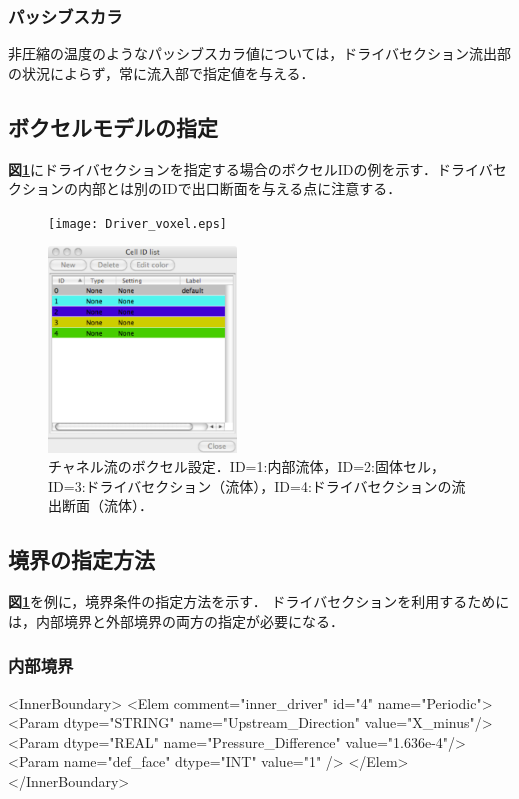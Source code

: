 \subsubsection{パッシブスカラ}
非圧縮の温度のようなパッシブスカラ値については，ドライバセクション流出部の状況によらず，常に流入部で指定値を与える．


%
\subsection{ボクセルモデルの指定}
\textbf{図\ref{fig:Driver_voxel}}にドライバセクションを指定する場合のボクセルIDの例を示す．ドライバセクションの内部とは別のIDで出口断面を与える点に注意する．

\begin{figure}[htbp]
\begin{minipage}{.65\textwidth}
\begin{center}
\texttt{[image: Driver\_voxel.eps]}
\end{center}
\end{minipage} \hfill
\begin{minipage}{.3\textwidth}
\begin{center}
\includegraphics[width=5cm,clip]{Cell_id.eps}
\end{center}
\end{minipage}
\caption{チャネル流のボクセル設定．ID=1:内部流体，ID=2:固体セル，ID=3:ドライバセクション（流体），ID=4:ドライバセクションの流出断面（流体）．}
\label{fig:Driver_voxel}
\end{figure}

%
\pagebreak
\subsection{境界の指定方法}
\textbf{図\ref{fig:Driver_voxel}}を例に，境界条件の指定方法を示す．
ドライバセクションを利用するためには，内部境界と外部境界の両方の指定が必要になる．

\subsubsection{内部境界}
{ \small
\begin{program}
<InnerBoundary>
  <Elem comment="inner_driver" id="4" name="Periodic">
    <Param dtype="STRING" name="Upstream_Direction"  value="X_minus"/>
    <Param dtype="REAL"   name="Pressure_Difference" value="1.636e-4"/>
    <Param name="def_face"  dtype="INT"  value="1" />
  </Elem>
</InnerBoundary>
\end{program}
}


